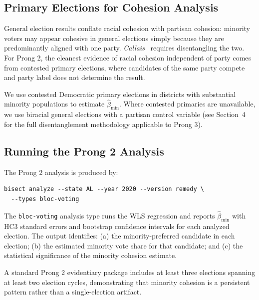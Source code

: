 \subsection{Primary Elections for Cohesion Analysis}

General election results conflate racial cohesion with partisan cohesion:
minority voters may appear cohesive in general elections simply because they
are predominantly aligned with one party.  \textit{Callais}~\citep{callais2026}
requires disentangling the two.  For Prong 2, the cleanest evidence of
racial cohesion independent of party comes from contested primary elections,
where candidates of the same party compete and party label does not determine
the result.

We use contested Democratic primary elections in districts with substantial
minority populations to estimate $\hat{\beta}_{\text{min}}$.  Where contested
primaries are unavailable, we use biracial general elections with a
partisan control variable (see Section~4 for the full disentanglement
methodology applicable to Prong 3).

\subsection{Running the Prong 2 Analysis}

The Prong 2 analysis is produced by:
\begin{verbatim}
bisect analyze --state AL --year 2020 --version remedy \
  --types bloc-voting
\end{verbatim}
The \texttt{bloc-voting} analysis type runs the WLS regression and reports
$\hat{\beta}_{\text{min}}$ with HC3 standard errors and bootstrap confidence
intervals for each analyzed election.  The output identifies: (a) the
minority-preferred candidate in each election; (b) the estimated minority
vote share for that candidate; and (c) the statistical significance of the
minority cohesion estimate.

A standard Prong 2 evidentiary package includes at least three elections
spanning at least two election cycles, demonstrating that minority cohesion
is a persistent pattern rather than a single-election artifact.
